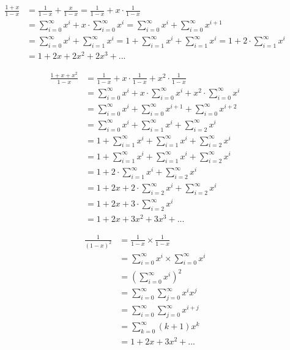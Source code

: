 \documentclass{article} %
\begin{document}
\begin{enumerate}
\[    \] 
    \begin{mybox}
    \begin{align*}
        \frac{1 + x}{1 - x} & = \frac{1}{1 - x} + \frac{x}{1 - x} 
         = \frac{1}{1 - x} + x \cdot \frac{1}{1 - x} \\
        & =  \sum_{i=0}^{\infty} x^i + x \cdot \sum_{i=0}^{\infty} x^i 
        =  \sum_{i=0}^{\infty} x^i + \sum_{i=0}^{\infty} x^{i+1} \\
        &  =  \sum_{i=0}^{\infty} x^i + \sum_{i=1}^{\infty} x^{i} 
        = 1+  \sum_{i=1}^{\infty} x^i + \sum_{i=1}^{\infty} x^{i} = 1+ 2 \cdot  \sum_{i=1}^{\infty} x^i \\
       &  = 1 + 2x + 2x^2 + 2x^3 + ...
    \end{align*}
    \end{mybox}
    \begin{mybox}
    \begin{align*}
        \frac{1 + x + x^2}{1 - x} &  = \frac{1}{1 - x} + x \cdot \frac{1}{1 - x} + x^2 \cdot \frac{1}{1 - x} \\
        &  = \sum_{i=0}^{\infty} x^i + x \cdot \sum_{i=0}^{\infty} x^i + x^2 \cdot \sum_{i=0}^{\infty} x^i \\
       & = \sum_{i=0}^{\infty} x^i +\sum_{i=0}^{\infty} x^{i+1} +  \sum_{i=0}^{\infty}  x^{i+2} \\
        & = \sum_{i=0}^{\infty} x^i +\sum_{i=1}^{\infty} x^{i} +  \sum_{i=2}^{\infty}  x^{i} \\
        & = 1 + \sum_{i=1}^{\infty} x^i +\sum_{i=1}^{\infty} x^{i} +  \sum_{i=2}^{\infty}  x^{i}  \\
        & = 1 + \sum_{i=1}^{\infty} x^i +  \sum_{i=1}^{\infty} x^{i} +  \sum_{i=2}^{\infty}  x^{i}  \\
         & = 1+ 2 \cdot  \sum_{i=1}^{\infty} x^i  +  \sum_{i=2}^{\infty}  x^{i} \\
         & = 1+ 2x + 2 \cdot  \sum_{i=2}^{\infty} x^i  +  \sum_{i=2}^{\infty}  x^{i} \\
          & = 1+ 2x + 3 \cdot  \sum_{i=2}^{\infty} x^i  \\
          & =  1+ 2x + 3x^2 + 3x^3 + ...
        \end{align*}
    \end{mybox}
    \begin{mybox}
    \begin{align*}
        \frac{1}{(1 - x)^2} & = \frac{1}{1 - x} \times \frac{1}{1 - x} \\
        & = \sum_{i=0}^{\infty} x^i \times \sum_{i=0}^{\infty} x^i \\
        & = (\sum_{i=0}^{\infty} x^i)^2 \\
        & = \sum_{i=0}^{\infty} \sum_{j=0}^{\infty} x^i x^j \\
        & = \sum_{i=0}^{\infty} \sum_{j=0}^{\infty} x^{i+j} \\ 
        & = \sum_{k=0}^{\infty} (k+1)x^{k} \\ 
        & = 1 + 2x + 3x^2 + ...
    \end{align*}
    \end{mybox}
\end{enumerate}
\newpage 
\end{document}
